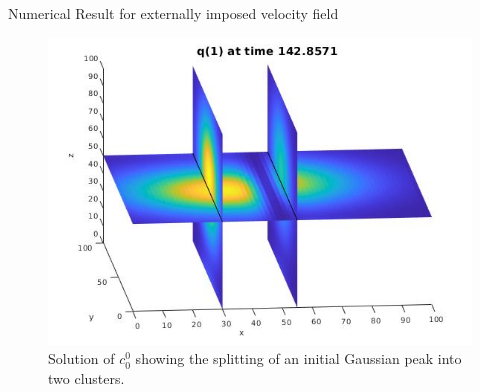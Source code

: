 \begin{frame}{Numerical Result for externally imposed velocity field}
\begin{figure}[H]
\begin{minipage}{0.32\textwidth}
    			\includegraphics[width=\linewidth]{Bilder_3D/1Glocke_wxi=wyj=1_wzk=0_2Cluster_t=142_2}
    		\end{minipage}
    		\caption{Solution of $c^0_0$ showing the splitting of an initial Gaussian peak into two clusters.}
    	\end{figure}
    \end{frame}


